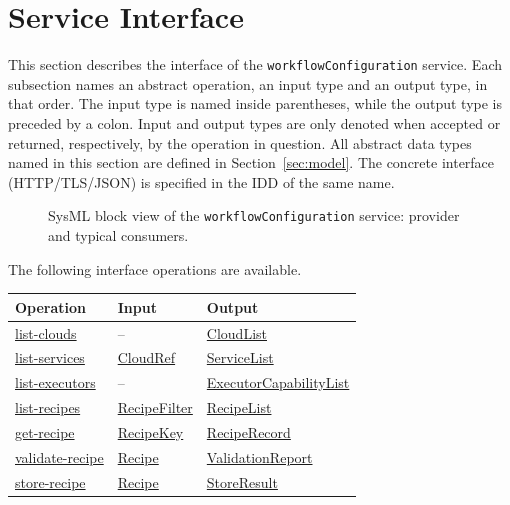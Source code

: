 \documentclass[a4paper]{arrowhead}
\newcommand{\mref}[1]{{\textcolor{ArrowheadPurple}{\hyperref[sec:model:#1]{#1}}}}
\newcommand{\oref}[1]{{\textcolor{ArrowheadBlue}{\hyperref[sec:operations:#1]{#1}}}}
\begin{document}
\newpage
\section{Service Interface}
\label{sec:operations}
This section describes the interface of the \texttt{workflow\allowbreak{}Configuration} service. Each subsection names an abstract operation,
an input type and an output type, in that order. The input type is named inside parentheses, while the output type is
preceded by a colon. Input and output types are only denoted when accepted or returned, respectively, by the operation
in question. All abstract data types named in this section are defined in Section~\ref{sec:model}. The concrete
interface (HTTP/TLS/JSON) is specified in the IDD of the same name.

\begin{figure}[ht!]
  \centering
  \caption{SysML block view of the \texttt{workflowConfiguration} service: provider and typical consumers.}
  \label{fig:SD}
\end{figure}

The following interface operations are available.

{\small
\begin{longtable}{|p{4.4cm}|p{5.6cm}|p{5.8cm}|}

\hline
\rowcolor{gray!33} Operation & Input & Output \\ \hline
\endhead
\oref{list-clouds} & -- & \mref{CloudList} \\ \hline
\oref{list-services} & \mref{CloudRef} & \mref{ServiceList} \\ \hline
\oref{list-executors} & -- & \mref{ExecutorCapabilityList} \\ \hline
\oref{list-recipes} & \mref{RecipeFilter} & \mref{RecipeList} \\ \hline
\oref{get-recipe} & \mref{RecipeKey} & \mref{RecipeRecord} \\ \hline
\oref{validate-recipe} & \mref{Recipe} & \mref{ValidationReport} \\ \hline
\oref{store-recipe} & \mref{Recipe} & \mref{StoreResult} \\ \hline
\end{longtable}
}
\end{document}
